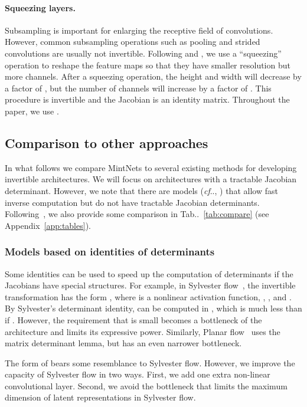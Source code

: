 \documentclass{article}
\makeatletter
\def\@onedot{\ifx\@let@token.\else.\null\fi\xspace}
\DeclareRobustCommand\onedot{\futurelet\@let@token\@onedot}
\newcommand{\tabref}[1]{Tab\onedot~\ref{#1}}
\def\cf{\emph{cf}\onedot}
\makeatother
\begin{document}
\paragraph{Squeezing layers.} Subsampling is important for enlarging the receptive field of convolutions. However, common subsampling operations such as pooling and strided convolutions are usually not invertible. Following \cite{nvp} and \cite{i-resnet}, we use a ``squeezing'' operation to reshape the feature maps  so that they have smaller resolution but more channels. After a squeezing operation, the height and width will decrease by a factor of 
, but the number of channels will increase by a factor of .  This procedure is invertible and the Jacobian is an identity matrix. Throughout the paper, we use .

\subsection{Comparison to other approaches}\label{sec:connection}
In what follows we compare MintNets to several existing methods for developing invertible architectures. We will focus on architectures with a tractable Jacobian determinant. However, we note that there are models (\cf, \cite{gomez2017reversible,mackay2018reversible,revnet}) that allow fast inverse computation but do not have tractable Jacobian determinants. Following~\cite{i-resnet}, we also provide some comparison in \tabref{tab:compare} (see Appendix~\ref{app:tables}).

\subsubsection{Models based on identities of determinants} Some identities can be used to speed up the computation of determinants if the Jacobians have special structures. For example, in Sylvester flow~\cite{berg2018sylvester}, the invertible transformation has the form , where  is a nonlinear activation function, , ,  and . By Sylvester's determinant identity,  can be computed in , which is much less than  if . However, the requirement that  is small becomes a bottleneck of the architecture and limits its expressive power. Similarly, Planar flow~\cite{rezende15variational} uses the matrix determinant lemma, but has an even narrower bottleneck. 

The form of  bears some resemblance to Sylvester flow. However, we improve the capacity of Sylvester flow in two ways. First, we add one extra non-linear convolutional layer. Second, we avoid the bottleneck that limits the maximum dimension of latent representations in Sylvester flow.
\end{document}

